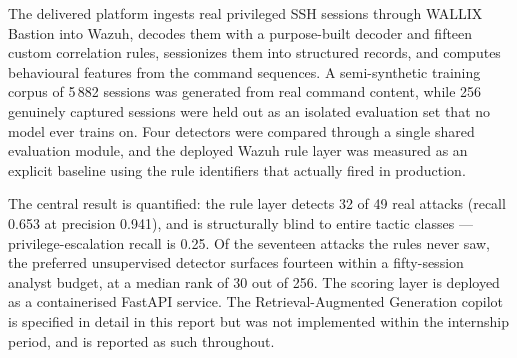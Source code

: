 \documentclass{classeENS}
\begin{document}
The delivered platform ingests real privileged SSH sessions through WALLIX Bastion into Wazuh, decodes them with a purpose-built decoder and fifteen custom correlation rules, sessionizes them into structured records, and computes behavioural features from the command sequences. A semi-synthetic training corpus of 5\,882 sessions was generated from real command content, while 256 genuinely captured sessions were held out as an isolated evaluation set that no model ever trains on. Four detectors were compared through a single shared evaluation module, and the deployed Wazuh rule layer was measured as an explicit baseline using the rule identifiers that actually fired in production.

The central result is quantified: the rule layer detects 32 of 49 real attacks (recall 0.653 at precision 0.941), and is structurally blind to entire tactic classes --- privilege-escalation recall is 0.25. Of the seventeen attacks the rules never saw, the preferred unsupervised detector surfaces fourteen within a fifty-session analyst budget, at a median rank of 30 out of 256. The scoring layer is deployed as a containerised FastAPI service. The Retrieval-Augmented Generation copilot is specified in detail in this report but was not implemented within the internship period, and is reported as such throughout.

\vspace{1cm}

\newpage

\tabledematieres
\tabledefigure
\tabledetableau

\end{document}
